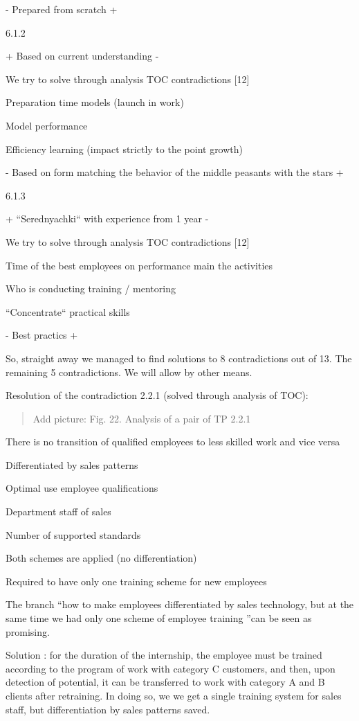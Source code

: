\documentclass[11pt,a4paper]{book}
\newcommand{\addpicture}[1]{
  \begin{quote} Add picture: #1\end{quote}
}
\begin{document}
- Prepared from scratch +

6.1.2

+ Based on current understanding -

We try to solve through analysis TOC contradictions [12]

Preparation time models (launch in work)

Model performance

Efficiency learning (impact strictly to the point growth)

- Based on form matching the behavior of the middle peasants with the stars +

6.1.3

+ “Serednyachki“ with experience from 1 year -

We try to solve through analysis TOC contradictions [12]

Time of the best employees on performance main the activities

Who is conducting training / mentoring

“Concentrate“ practical skills

- Best practics +


So, straight away we managed to find solutions to 8 contradictions out of
13. The remaining 5 contradictions.  We will allow by other means.

Resolution of the contradiction 2.2.1 (solved through analysis of TOC):


\addpicture{Fig. 22. Analysis of a pair of TP 2.2.1}

There is no transition of qualified employees to less skilled work and vice
versa

Differentiated by sales patterns

Optimal use employee qualifications

Department staff of sales

Number of supported standards

Both schemes are applied (no differentiation)

Required to have only one training scheme for new employees


The branch “how to make employees differentiated by sales technology, but at
the same time we had only one scheme of employee training ”can be seen as
promising.

Solution : for the duration of the internship, the employee must be trained
according to the program of work with category C customers, and then, upon
detection of potential, it can be transferred to work with category A and B
clients after retraining. In doing so, we we get a single training system for
sales staff, but differentiation by sales patterns saved.
\end{document}

